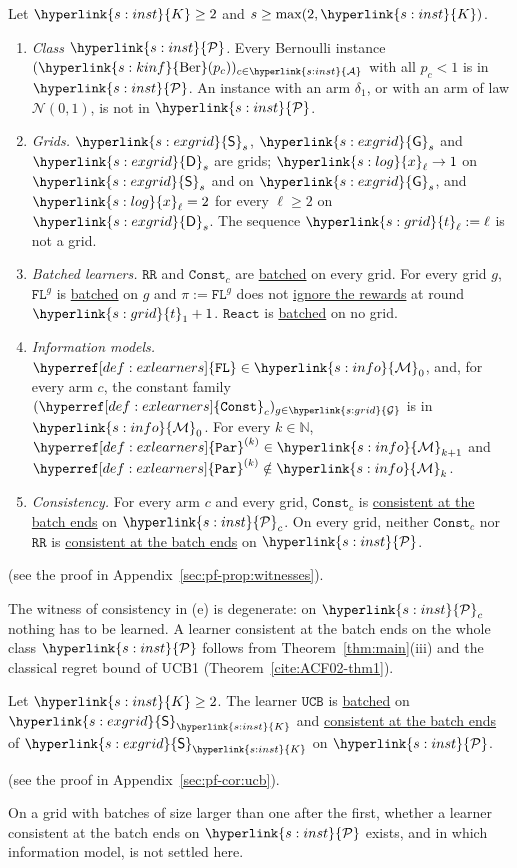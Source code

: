 \documentclass[11pt]{article}
\newcommand{\sy}[2]{{\hyperlink{#1}{#2}}}
\newcommand{\term}[2]{\hyperlink{#1}{#2}}
\newcommand{\1}{\mathbf{1}}
\newcommand{\Nat}{\mathbb{N}}
\newcommand{\Arms}{\sy{s:inst}{\mathcal A}}
\newcommand{\Kar}{\sy{s:inst}{K}}
\newcommand{\cP}{\sy{s:inst}{\mathcal P}}
\newcommand{\Ber}{\sy{s:kinf}{\mathrm{Ber}}}
\newcommand{\Gr}{\sy{s:grid}{\mathcal G}}
\newcommand{\tl}{\sy{s:grid}{t}}
\newcommand{\xg}{\sy{s:log}{x}}
\newcommand{\Sq}{\sy{s:exgrid}{\mathsf S}}
\newcommand{\Ge}{\sy{s:exgrid}{\mathsf G}}
\newcommand{\Db}{\sy{s:exgrid}{\mathsf D}}
\newcommand{\Mk}[1]{\sy{s:info}{\mathcal M}_{#1}}
\newcommand{\RR}{\hyperref[def:exlearners]{\texttt{RR}}}
\newcommand{\Const}{\hyperref[def:exlearners]{\texttt{Const}}}
\newcommand{\FL}{\hyperref[def:exlearners]{\texttt{FL}}}
\newcommand{\React}{\hyperref[def:exlearners]{\texttt{React}}}
\newcommand{\Par}{\hyperref[def:exlearners]{\texttt{Par}}}
\newcommand{\UCB}{\hyperref[def:exlearners]{\texttt{UCB}}}
\newcommand{\batched}{\term{t:batched}{batched}}
\newcommand{\consistent}{\term{t:cons}{consistent at the batch ends}}
\begin{document}
\begin{proposition}\label{prop:witnesses}
Let $\Kar\ge2$ and $s\ge\max(2,\Kar)$.
\begin{enumerate}[label=(\alph*)]
\item \emph{Class $\cP$.} Every Bernoulli instance $(\Ber(p_c))_{c\in\Arms}$ with all $p_c<1$ is in
  $\cP$. An instance with an arm $\delta_1$, or with an arm of law $\mathcal N(0,1)$, is not in $\cP$.
\item \emph{Grids.} $\Sq_s$, $\Ge_s$ and $\Db_s$ are grids; $\xg_\ell\to1$ on $\Sq_s$ and on $\Ge_s$,
  and $\xg_\ell=2$ for every $\ell\ge2$ on $\Db_s$. The sequence $\tl_\ell:=\ell$ is not a grid.
\item \emph{Batched learners.} $\RR$ and $\Const_c$ are \batched{} on every grid. For every grid
  $g$, $\FL^g$ is \batched{} on $g$ and $\pi:=\FL^g$ does not \term{t:sees}{ignore the rewards} at
  round $\tl_1+1$. $\React$ is \batched{} on no grid.
\item \emph{Information models.} $\FL\in\Mk{0}$, and, for every arm $c$, the constant family
  $(\Const_c)_{g\in\Gr}$ is in $\Mk{0}$. For every $k\in\Nat$, $\Par^{(k)}\in\Mk{k+1}$ and
  $\Par^{(k)}\notin\Mk{k}$.
\item \emph{Consistency.} For every arm $c$ and every grid, $\Const_c$ is \consistent{} on $\cP_c$.
  On every grid, neither $\Const_c$ nor $\RR$ is \consistent{} on $\cP$.
\end{enumerate}
\end{proposition}
(see the proof in Appendix~\ref{sec:pf-prop:witnesses}).

The witness of consistency in (e) is degenerate: on $\cP_c$ nothing has to be learned. A learner
consistent at the batch ends on the whole class $\cP$ follows from Theorem~\ref{thm:main}(iii) and
the classical regret bound of UCB1 \citep[Theorem~1]{ACF02} (Theorem~\ref{cite:ACF02-thm1}).

\begin{corollary}\label{cor:ucb}
Let $\Kar\ge2$. The learner $\UCB$ is \batched{} on $\Sq_{\Kar}$ and \consistent{} of $\Sq_{\Kar}$
on $\cP$.
\end{corollary}
(see the proof in Appendix~\ref{sec:pf-cor:ucb}).

On a grid with batches of size larger than one after the first, whether a learner consistent at the
batch ends on $\cP$ exists, and in which information model, is not settled here.
\end{document}
